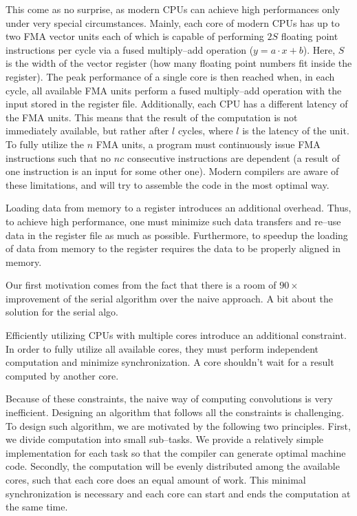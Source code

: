   This come as no surprise, as modern CPUs can achieve high
  performances only under very special circumstances.  Mainly, each
  core of modern CPUs has up to two FMA vector units each of which is
  capable of performing $2S$ floating point instructions per cycle via
  a fused multiply--add operation ($y = a\cdot x + b$).  Here, $S$ is
  the width of the vector register (how many floating point numbers
  fit inside the register).  The peak performance of a single core is
  then reached when, in each cycle, all available FMA units perform a
  fused multiply--add operation with the input stored in the register
  file.  Additionally, each CPU has a different latency of the FMA
  units.  This means that the result of the computation is not
  immediately available, but rather after $l$ cycles, where $l$ is the
  latency of the unit.  To fully utilize the $n$ FMA units, a program
  must continuously issue FMA instructions such that no $nc$
  consecutive instructions are dependent (a result of one instruction
  is an input for some other one).  Modern compilers are aware of
  these limitations, and will try to assemble the code in the most
  optimal way.

  Loading data from memory to a register introduces an additional
  overhead.  Thus, to achieve high performance, one must minimize such
  data transfers and re--use data in the register file as much as
  possible.  Furthermore, to speedup the loading of data from memory
  to the register requires the data to be properly aligned in memory.

  Our first motivation comes from the fact that there is a room of $90
  \times$ improvement of the serial algorithm over the naive approach.
  A bit about the solution for the serial algo.

  Efficiently utilizing CPUs with multiple cores introduce an
  additional constraint.  In order to fully utilize all available
  cores, they must perform independent computation and minimize
  synchronization.  A core shouldn't wait for a result computed by
  another core.

  Because of these constraints, the naive way of computing
  convolutions is very inefficient.  Designing an algorithm that
  follows all the constraints is challenging.  To design such
  algorithm, we are motivated by the following two principles.  First,
  we divide computation into small sub--tasks.  We provide a
  relatively simple implementation for each task so that the compiler
  can generate optimal machine code.  Secondly, the computation will
  be evenly distributed among the available cores, such that each core
  does an equal amount of work.  This minimal synchronization is
  necessary and each core can start and ends the computation at the
  same time.

